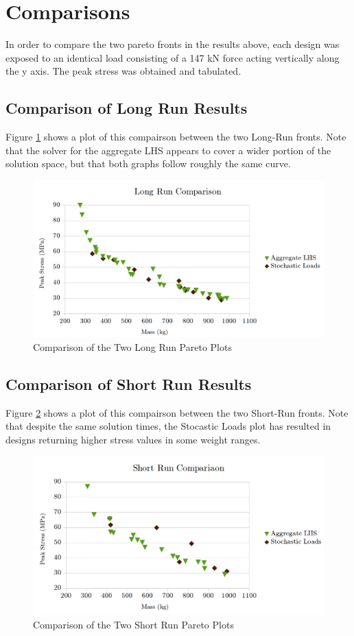 \section{Comparisons}
In order to compare the two pareto fronts in the results above, each design was exposed to an identical load consisting of a 147 kN force acting vertically along the y axis. The peak stress was obtained and tabulated. 

\subsection{Comparison of Long Run Results}
Figure \ref{fig:pfront_comp_long} shows a plot of this compairson between the two Long-Run fronts. Note that the solver for the aggregate LHS appears to cover a wider portion of the solution space, but that both graphs follow roughly the same curve. 

\begin{figure}[!htbp]
\includegraphics[width=\textwidth]{img/pf_comp_long.png}
\caption{Comparison of the Two Long Run Pareto Plots}
\label{fig:pfront_comp_long}
\end{figure}

\subsection{Comparison of Short Run Results}
Figure \ref{fig:pfront_comp_short} shows a plot of this compairson between the two Short-Run fronts. Note that despite the same solution times, the Stocastic Loads plot has resulted in designs returning higher stress values in some weight ranges. 

\begin{figure}[!htbp]
\includegraphics[width=\textwidth]{img/pf_comp_short.png}
\caption{Comparison of the Two Short Run Pareto Plots}
\label{fig:pfront_comp_short}
\end{figure}
